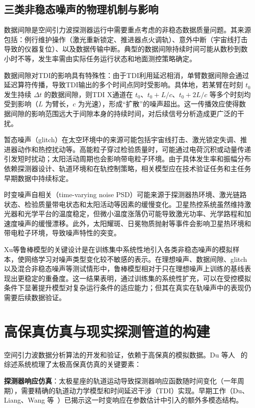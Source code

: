 \subsection{三类非稳态噪声的物理机制与影响}

数据间隙是空间引力波探测器运行中需要重点考虑的非稳态数据质量问题。其来源包括：例行维护操作（激光重新锁定、推进器点火调轨）、意外中断（宇宙线打击导致的仪器复位）、以及数据传输中断。典型的数据间隙持续时间可能从数秒到数小时不等，发生率需由实际任务运行状态和地面测控策略确定。

数据间隙对TDI的影响具有特殊性：由于TDI利用延迟相消，单臂数据间隙会通过延迟算符传播，导致TDI输出的多个时间点同时受影响。具体地，若某臂在时刻 $t_0$ 发生持续 $\Delta t$ 的数据间隙，则TDI X通道在 $t_0$、$t_0 + L/c$、$t_0 + 2L/c$ 等多个时刻均受到影响（$L$ 为臂长，$c$ 为光速），形成“扩散”的噪声超出。这一传播效应使得数据间隙的影响范围远大于间隙本身的持续时间，对后续信号分析造成更广泛的干扰。

暂态噪声（glitch）在太空环境中的来源可能包括宇宙线打击、激光锁定失调、推进器动作和热控扰动等。高能粒子穿过检验质量时，可能通过电荷沉积或动量传递引发短时扰动；太阳活动周期也会影响带电粒子环境。由于具体发生率和振幅分布依赖探测器设计、轨道环境和在轨控制策略，相关模型应在技术验证任务和主任务早期数据中持续标定。

时变噪声自相关（time-varying noise PSD）可能来源于探测器热环境、激光链路状态、检验质量带电状态和太阳活动等因素的缓慢变化。卫星热控系统虽然维持激光器和光学平台的温度稳定，但微小温度涨落仍可能导致激光功率、光学路程和加速度噪声的缓慢漂移。此外，太阳耀斑、日冕物质抛射等事件会影响卫星热环境和带电粒子环境，导致噪声特性的突变。

Xu等鲁棒模型的关键设计是在训练集中系统性地引入各类非稳态噪声的模拟样本，使网络学习对噪声类型变化较不敏感的表示。在理想噪声、数据间隙、glitch以及混合非稳态噪声等测试情形中，鲁棒模型相对于只在理想噪声上训练的基线表现出更稳定的重叠度。这一结果表明，通过训练集的系统性扩充，可以在受控模拟条件下显著提升模型对复杂运行条件的适应能力；但其在真实在轨噪声中的表现仍需要后续数据验证。

\section{高保真仿真与现实探测管道的构建}

空间引力波数据分析算法的开发和验证，依赖于高保真的模拟数据。Du 等人~\cite{du2026taiji} 的综述系统梳理了太极高保真仿真的关键要素：

\textbf{探测器响应仿真}：太极星座的轨道运动导致探测器响应函数随时间变化（一年周期），需要精确的轨道动力学模型和时间延迟干涉（TDI）实现。早期工作（Du、Liang、Wang 等~\cite{du2024normflow}）已揭示这一时变响应在参数估计中引入的额外多模态结构。


